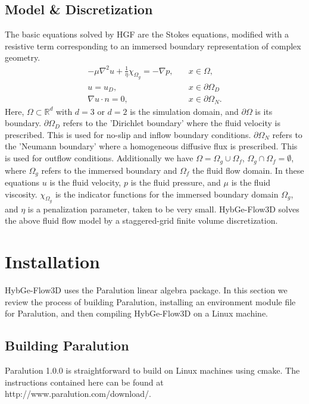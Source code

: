 \documentclass{report}
\begin{document}
\section{Model \& Discretization}

The basic equations solved by HGF are the Stokes equations, modified
with a resistive term corresponding to an immersed boundary representation of complex geometry.
\begin{align*}
  -\mu \nabla^2 u + \frac{1}{\eta}\chi_{\Omega_g} = -\nabla p, \quad &x\in \Omega, \\
  u = u_D, \quad &x\in \partial \Omega_D \\
  \nabla u \cdot n = 0, \quad &x\in \partial \Omega_N.
\end{align*}
Here, $\Omega \subset \mathbb{R}^d$ with $d=3$ or $d=2$ is the simulation domain,
and $\partial \Omega$ is its boundary. $\partial \Omega_D$ refers to the
'Dirichlet boundary' where the fluid velocity is prescribed. This is used
for no-slip and inflow boundary conditions.
$\partial \Omega_N$ refers to the 'Neumann boundary' where a homogeneous diffusive flux
is prescribed. This is used for outflow conditions.
Additionally we have $\Omega = \Omega_g \cup \Omega_f$, $\Omega_g \cap \Omega_f = \emptyset$,
where $\Omega_g$ refers to the immersed boundary and $\Omega_f$ the fluid flow domain.
In these equations $u$ is the fluid velocity, $p$ is the fluid pressure,
and $\mu$ is the fluid viscosity. $\chi_{\Omega_g}$ is the indicator functions
for the immersed boundary domain $\Omega_g$, and $\eta$ is a penalization
parameter, taken to be very small.
HybGe-Flow3D solves the above fluid flow model by a staggered-grid
finite volume discretization.

\chapter{Installation}

HybGe-Flow3D uses the Paralution linear algebra package. In this section
we review the process of building Paralution, installing an environment module file
for Paralution,
and then compiling HybGe-Flow3D on a Linux machine.

\section{Building Paralution}

Paralution 1.0.0 is straightforward to build on Linux machines
using cmake. The instructions contained here can be found at \\
http://www.paralution.com/download/.\\
\end{document}
